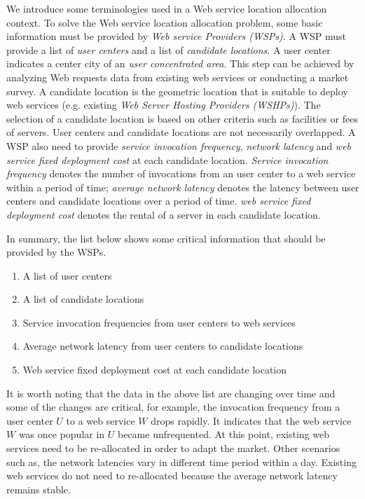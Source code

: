 We introduce some terminologies used in a Web service location allocation context.
To solve the Web service location allocation problem, 
some basic information must be provided by \emph{Web service Providers (WSPs)}. A WSP must provide a list 
of \emph{user centers} and a list of \emph{candidate locations}. A user center indicates a center city of an \emph{user concentrated area}. 
This step can be achieved by analyzing Web requests data from existing web services or conducting a market survey. 
A candidate location is the geometric location that is suitable to 
deploy web services (e.g. existing \emph{Web Server Hosting Providers (WSHPs)}). 
The selection of a candidate location is based on other criteria such as facilities or fees of servers. 
User centers and candidate locations are not necessarily overlapped.
A WSP also need to provide \emph{service invocation frequency}, \emph{network latency} and \emph{web service fixed deployment cost} at each candidate location. 
\emph{Service invocation frequency} denotes the number of invocations from an user center
to a web service within a period of time; \emph{average network latency} denotes the latency between user centers and candidate locations over a period of time.
\emph{web service fixed deployment cost} denotes the rental of a server in each candidate location.

In summary, the list below shows some critical information that should be provided by the WSPs.

\begin{enumerate}
	\itemsep0em
	\item A list of user centers
	\item A list of candidate locations
	\item Service invocation frequencies from user centers to web services
	\item Average network latency from user centers to candidate locations
	\item Web service fixed deployment cost at each candidate location
\end{enumerate}

It is worth noting that the data in the above list are changing over time and some of the changes are critical,
for example, the invocation frequency from a user center $U$ to a web service $W$ drops rapidly. 
It indicates that the web service $W$ was once popular in $U$ became unfrequented.
At this point, existing web services need to be re-allocated in order to adapt the market. Other scenarios such as,
the network latencies vary in different time period within a day. Existing web services do not need to re-allocated because 
the average network latency remains stable.


